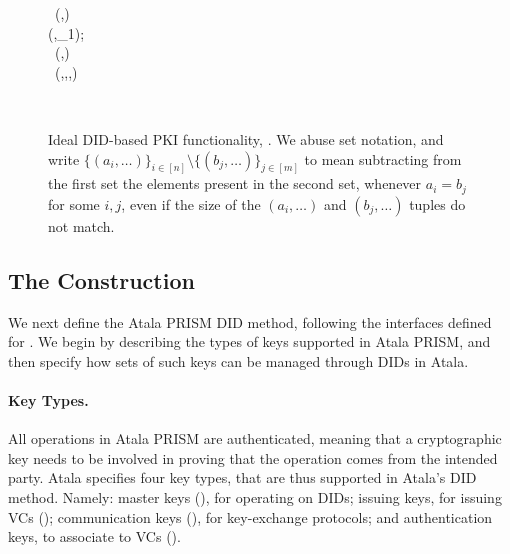 \begin{figure}
\begin{framed}
{\begin{minipage}[t]{0.5\textwidth}
{          \ucrecv~(,\tau)~~\IdealGclock \\          
          \didOp \gets (\did,\sval_1);
          \didOP \gets \didOP \cup {} \\
          \ucsend~(,\didOp)~~\IdealGdledger \\          
          ~(,\sid,\did,\didOp)
        }
      \end{minipage}
    }
    \vspace*{0.25em} \\
  \end{framed}
  \caption{Ideal DID-based PKI functionality, \IdealGPKIDID. We abuse set
    notation, and write $\lbrace (a_i,\dots) \rbrace_{i\in[n]} \setminus
    \lbrace (b_j,\dots) \rbrace_{j\in[m]}$ to mean subtracting from the first
    set the elements present in the second set, whenever $a_i = b_j$ for some
    $i,j$, even if the size of the $(a_i,\dots)$ and $(b_j,\dots)$ tuples do not
    match.}
  \label{fig:fpkidid}
\end{figure}

\subsection{The \RealPKIDIDAtala Construction}

We next define the Atala PRISM DID method, following the interfaces defined for
\IdealGPKIDID. We begin by describing the types of keys supported in Atala
PRISM, and then specify how sets of such keys can be managed through DIDs in
Atala.

\paragraph{Key Types.} %
All operations in Atala PRISM are authenticated, meaning that a cryptographic
key needs to be involved in proving that the operation comes from the intended
party. Atala specifies four key types, that are thus supported in Atala's DID
method. Namely: master keys (\MasterKey), for operating on DIDs; issuing keys,
for issuing VCs (\IssueKey); communication keys (\CommKey), for key-exchange
protocols; and authentication keys, to associate to VCs (\AuthKey).

